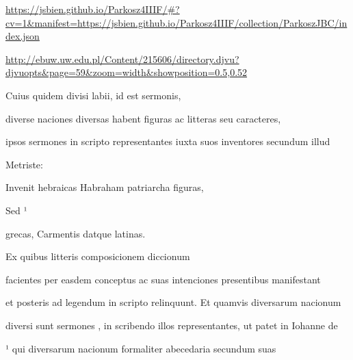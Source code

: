 
\newParkoszpage

{
\url{https://jsbien.github.io/Parkosz4IIIF/\#?cv=1&manifest=https://jsbien.github.io/Parkosz4IIIF/collection/ParkoszJBC/index.json}

\url{http://ebuw.uw.edu.pl/Content/215606/directory.djvu?djvuopts&page=59&zoom=width&showposition=0.5,0.52}
}
\fullpreviouslines


{
\color{blue}

Cuius quidem divisi labii, id est sermonis,

diverse naciones diversas habent figuras ac litteras seu caracteres,
}


\fulllines

ipsos sermones in scripto representantes iuxta suos inventores secundum illud

\splitlines{}

Metriste:

\indentKcyt Invenit hebraicas Habraham patriarcha figuras,


\indentKcyt Sed ¹

\splitlines{}

\indentKcyt \phantom{Sed Catius}grecas, Carmentis datque latinas.

\indentK Ex quibus litteris composicionem diccionum

\fulllines{}

facientes per easdem conceptus ac suas intenciones presentibus manifestant

et posteris ad legendum in scripto relinquunt. Et quamvis diversarum nacionum

diversi sunt sermones , in scribendo illos representantes, ut patet in Iohanne de


¹ qui diversarum nacionum formaliter abecedaria secundum suas


